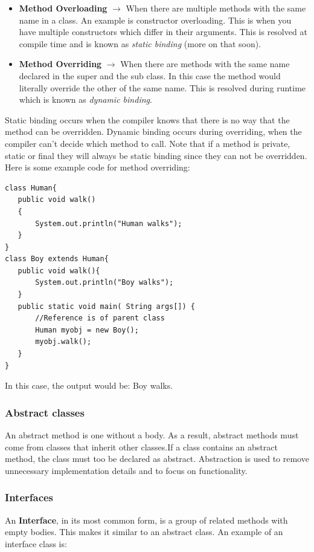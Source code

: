 \documentclass{article}
\begin{document}
\begin{itemize}
\item \textbf{Method Overloading} $\longrightarrow$ When there are multiple methods with the same name in a class. An example is constructor overloading. This is when you have multiple constructors which differ in their arguments. This is resolved at compile time and is known as \emph{static binding} (more on that soon).

\item \textbf{Method Overriding} $\longrightarrow$ When there are methods with the same name declared in the super and the sub class. In this case the method would literally override the other of the same name. This is resolved during runtime which is known as \emph{dynamic binding}.
\end{itemize}
Static binding occurs when the compiler knows that there is no way that the method can be overridden. Dynamic binding occurs during overriding, when the compiler can't decide which method to call. Note that if a method is private, static or final they will always be static binding since they can not be overridden. Here is some example code for method overriding:
\begin{lstlisting}
class Human{
   public void walk()
   {
       System.out.println("Human walks");
   }
}
class Boy extends Human{
   public void walk(){
       System.out.println("Boy walks");
   }
   public static void main( String args[]) {
       //Reference is of parent class
       Human myobj = new Boy();
       myobj.walk();
   }
}
\end{lstlisting}
In this case, the output would be: Boy walks. 
\newpage

\subsubsection{Abstract classes}

An abstract method is one without a body. As a result, abstract methods must come from classes that inherit other classes.If a class contains an abstract method, the class must too be declared as abstract. Abstraction is used to remove unnecessary implementation details and to focus on functionality.

\subsubsection{Interfaces}

An \textbf{Interface}, in its most common form, is a group of related methods with empty bodies. This makes it similar to an abstract class. An example of an interface class is:
\end{document}
